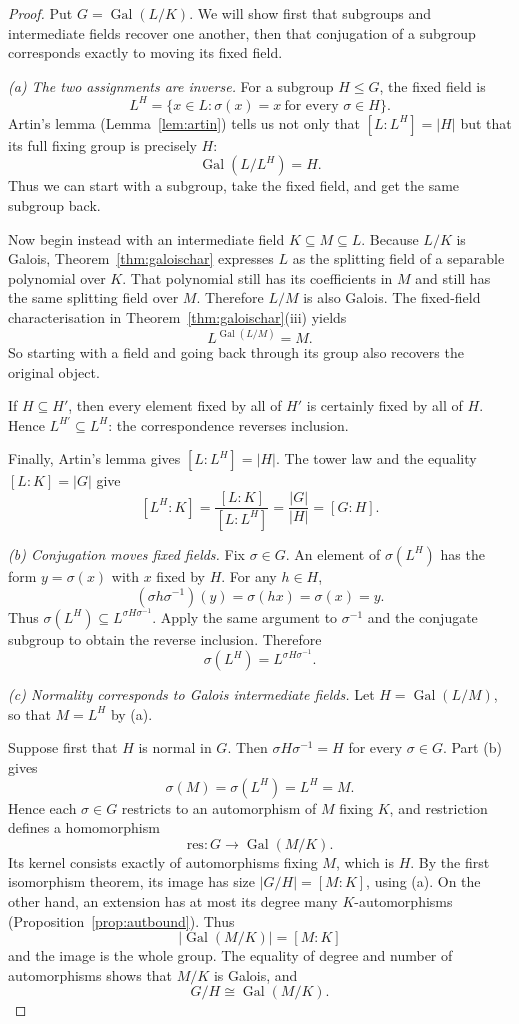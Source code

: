 \begin{proof}
Put $G=\operatorname{Gal}(L/K)$. We will show first that subgroups and intermediate fields recover one another, then that conjugation of a subgroup corresponds exactly to moving its fixed field.

\emph{(a) The two assignments are inverse.}
For a subgroup $H\le G$, the fixed field is
\[
L^H=\{x\in L:\sigma(x)=x\ \text{for every }\sigma\in H\}.
\]
Artin's lemma (Lemma~\ref{lem:artin}) tells us not only that $[L:L^H]=|H|$ but that its full fixing group is precisely $H$:
\[
\operatorname{Gal}(L/L^H)=H.
\]
Thus we can start with a subgroup, take the fixed field, and get the same subgroup back.

Now begin instead with an intermediate field $K\subseteq M\subseteq L$. Because $L/K$ is Galois, Theorem~\ref{thm:galoischar} expresses $L$ as the splitting field of a separable polynomial over $K$. That polynomial still has its coefficients in $M$ and still has the same splitting field over $M$. Therefore $L/M$ is also Galois. The fixed-field characterisation in Theorem~\ref{thm:galoischar}(iii) yields
\[
L^{\operatorname{Gal}(L/M)}=M.
\]
So starting with a field and going back through its group also recovers the original object.

If $H\subseteq H'$, then every element fixed by all of $H'$ is certainly fixed by all of $H$. Hence $L^{H'}\subseteq L^H$: the correspondence reverses inclusion.

Finally, Artin's lemma gives $[L:L^H]=|H|$. The tower law and the equality $[L:K]=|G|$ give
\[
[L^H:K]=\frac{[L:K]}{[L:L^H]}
=\frac{|G|}{|H|}=[G:H].
\]

\emph{(b) Conjugation moves fixed fields.}
Fix $\sigma\in G$. An element of $\sigma(L^H)$ has the form $y=\sigma(x)$ with $x$ fixed by $H$. For any $h\in H$,
\[
(\sigma h\sigma^{-1})(y)=\sigma(hx)=\sigma(x)=y.
\]
Thus $\sigma(L^H)\subseteq L^{\sigma H\sigma^{-1}}$. Apply the same argument to $\sigma^{-1}$ and the conjugate subgroup to obtain the reverse inclusion. Therefore
\[
\sigma(L^H)=L^{\sigma H\sigma^{-1}}.
\]

\emph{(c) Normality corresponds to Galois intermediate fields.}
Let $H=\operatorname{Gal}(L/M)$, so that $M=L^H$ by (a).

Suppose first that $H$ is normal in $G$. Then $\sigma H\sigma^{-1}=H$ for every $\sigma\in G$. Part (b) gives
\[
\sigma(M)=\sigma(L^H)=L^H=M.
\]
Hence each $\sigma\in G$ restricts to an automorphism of $M$ fixing $K$, and restriction defines a homomorphism
\[
\mathrm{res}:G\longrightarrow\operatorname{Gal}(M/K).
\]
Its kernel consists exactly of automorphisms fixing $M$, which is $H$. By the first isomorphism theorem, its image has size $|G/H|=[M:K]$, using (a). On the other hand, an extension has at most its degree many $K$-automorphisms (Proposition~\ref{prop:autbound}). Thus
\[
|\operatorname{Gal}(M/K)|=[M:K]
\]
and the image is the whole group. The equality of degree and number of automorphisms shows that $M/K$ is Galois, and
\[
G/H\cong\operatorname{Gal}(M/K).
\]


\end{proof}
